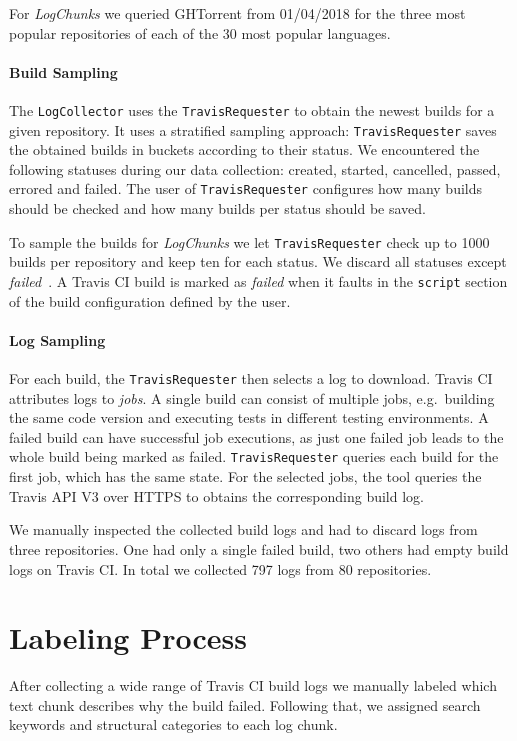 \documentclass[\myrootdir/main.tex]{subfiles}
\begin{document}
For \emph{LogChunks} we queried GHTorrent from 01/04/2018 for the three most popular repositories of each of the 30 most popular languages.

\paragraph{Build Sampling}
The \texttt{LogCollector} uses the \texttt{TravisRequester} to obtain the newest builds for a given repository.
It uses a stratified sampling approach: \texttt{TravisRequester} saves the obtained builds in buckets according to their status.
We encountered the following statuses during our data collection: created, started, cancelled, passed, errored and failed.
The user of \texttt{TravisRequester} configures how many builds should be checked and how many builds per status should be saved.

To sample the builds for \emph{LogChunks} we let \texttt{TravisRequester} check up to 1000 builds per repository and keep ten for each status.
We discard all statuses except \emph{failed}~\cite{travis2009buildstatus}.
A Travis CI build is marked as \emph{failed} when it faults in the \texttt{script} section of the build configuration defined by the user.

\paragraph{Log Sampling}
For each build, the \texttt{TravisRequester} then selects a log to download.
Travis CI attributes logs to \emph{jobs}.
A single build can consist of multiple jobs, e.g.\ building the same code version and executing tests in different testing environments.
A failed build can have successful job executions, as just one failed job leads to the whole build being marked as failed.
\texttt{TravisRequester} queries each build for the first job, which has the same state.
For the selected jobs, the tool queries the Travis API V3 over HTTPS to obtains the corresponding build log.

We manually inspected the collected build logs and had to discard logs from three repositories.
One had only a single failed build, two others had empty build logs on Travis CI\@.
In total we collected 797 logs from 80 repositories.

\section{Labeling Process}
\label{sec:labeling-process}
After collecting a wide range of Travis CI build logs we manually labeled which text chunk describes why the build failed.
Following that, we assigned search keywords and structural categories to each log chunk.
\end{document}
